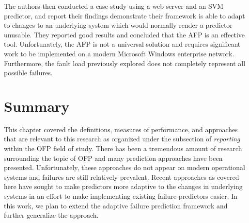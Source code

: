 The authors then conducted a case-study using a web server and an SVM
predictor, and report their findings demonstrate their framework is able to
adapt to changes to an underlying system which would normally render a
predictor unusable.  They reported good results and concluded that the AFP is
an effective tool.  Unfortunately, the AFP is not a universal solution and
requires significant work to be implemented on a modern Microsoft Windows
enterprise network.  Furthermore, the fault load previously explored does not
completely represent all possible failures.

\section{Summary} \label{litReviewSummary}
This chapter covered the definitions, measures of performance, and approaches
that are relevant to this research as organized under the subsection of
\emph{reporting} within the OFP field of study.  There has been a tremendous
amount of research surrounding the topic of OFP and many prediction approaches
have been presented.  Unfortunately, these approaches do not appear on modern
operational systems and failures are still relatively prevalent.  Recent
approaches as covered here have sought to make predictors more adaptive to the
changes in underlying systems in an effort to make implementing existing
failure predictors easier.  In this work, we plan to extend the adaptive
failure prediction framework and further generalize the approach.  
